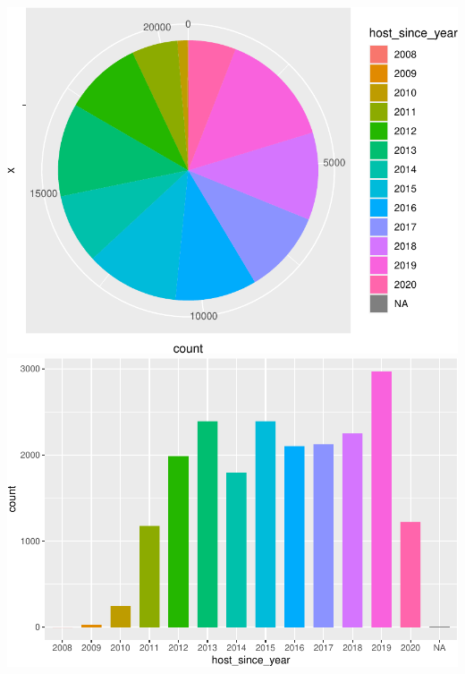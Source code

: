 \includegraphics{anal_files/figure-latex/unnamed-chunk-9-58.pdf}
\includegraphics{anal_files/figure-latex/unnamed-chunk-9-59.pdf}

